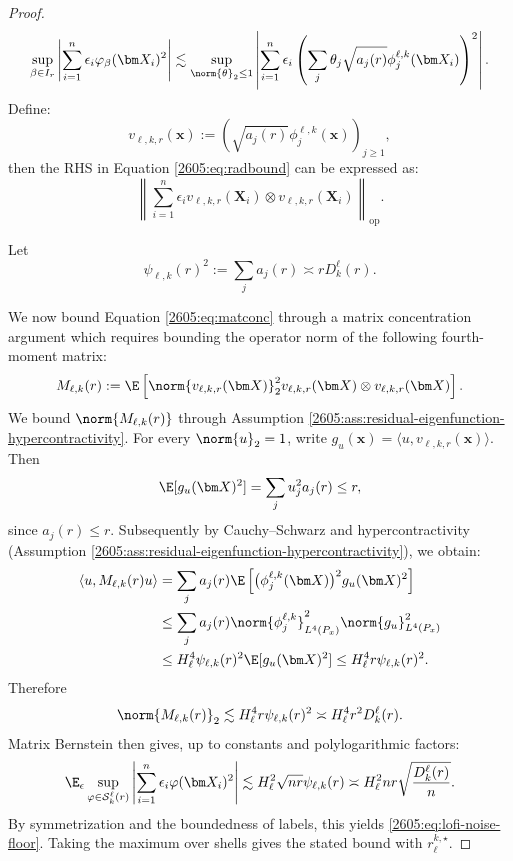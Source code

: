 \begin{proof}
\begin{equation}\label{2605:eq:radbound}
    \sup_{\beta\in I_r}
    \left|
        \sum_{i=1}^n
        \epsilon_i\varphi_\beta(\bm X_i)^2
    \right|
    \lesssim
    \sup_{\norm{\theta}_2\le1}
    \left|
        \sum_{i=1}^n
        \epsilon_i
        \left(
            \sum_j
            \theta_j\sqrt{a_j(r)}\phi_j^{\ell,k}(\bm X_i)
        \right)^2
    \right|.
\end{equation}
Define:
\[
    v_{\ell,k,r}(\bm x)
    :=
    \left(\sqrt{a_j(r)} \phi_j^{\ell,k}(\bm x)\right)_{j\ge1},
\]
then the RHS in Equation \ref{2605:eq:radbound} can be expressed as:
\begin{equation}\label{2605:eq:matconc}
    \left\|
        \sum_{i=1}^n
        \epsilon_i
        v_{\ell,k,r}(\bm X_i)\otimes
        v_{\ell,k,r}(\bm X_i)
    \right\|_{\mathrm{op}}.
\end{equation}

Let
\[
    \psi_{\ell,k}(r)^2
    :=
    \sum_j a_j(r)
    \asymp rD^\ell_k(r).
\]

We now bound Equation \ref{2605:eq:matconc} through a matrix concentration argument which requires bounding the operator norm of the following fourth-moment matrix:
\[
    M_{\ell,k}(r)
    :=
        \E \left[
            \norm{v_{\ell,k,r}(\bm X)}_2^2
            v_{\ell,k,r}(\bm X)
            \otimes
            v_{\ell,k,r}(\bm X)
        \right].
\]
We bound $\norm{M_{\ell,k}(r)}$ through Assumption \ref{2605:ass:residual-eigenfunction-hypercontractivity}. For every \(\norm{u}_2=1\),
write \(g_u(\bm x)=\langle u,v_{\ell,k,r}(\bm x)\rangle\). Then
\[
    \E[g_u(\bm X)^2]
    =
    \sum_j u_j^2a_j(r)
    \le r,
\]
since $a_j(r) \leq r$. Subsequently by Cauchy--Schwarz and hypercontractivity (Assumption \ref{2605:ass:residual-eigenfunction-hypercontractivity}), we obtain:
\[
    \begin{aligned}
    \left\langle u,M_{\ell,k}(r)u\right\rangle
    &=
    \sum_j a_j(r) 
    \E \left[
        \big(\phi_j^{\ell,k}(\bm X)\big)^2g_u(\bm X)^2
    \right]                                                   \\
    &\le
    \sum_j a_j(r) 
    \norm{\phi_j^{\ell,k}}_{L^4(P_x)}^2
    \norm{g_u}_{L^4(P_x)}^2                                   \\
    &\le
    H_\ell^4
    \psi_{\ell,k}(r)^2
    \E[g_u(\bm X)^2]
    \le
    H_\ell^4 r \psi_{\ell,k}(r)^2 .
    \end{aligned}
\]
Therefore
\[
   \norm{M_{\ell,k}(r)}_2
    \lesssim
    H_\ell^4 r \psi_{\ell,k}(r)^2
    \asymp
    H_\ell^4 r^2D^\ell_k(r).
\]
Matrix Bernstein then gives, up to constants and polylogarithmic
factors:
\[
    \E_\epsilon
    \sup_{\varphi\in\mathcal S^\ell_k(r)}
    \left|
        \sum_{i=1}^n\epsilon_i\varphi(\bm X_i)^2
    \right|
    \lesssim
    H_\ell^2\sqrt{nr} \psi_{\ell,k}(r)
    \asymp
    H_\ell^2 n r\sqrt{\frac{D^\ell_k(r)}{n}}.
\]
By symmetrization and the boundedness of labels, this
yields \eqref{2605:eq:lofi-noise-floor}. Taking the maximum over shells gives
the stated bound with \(r_\ell^{k,\star}\).
\end{proof}

